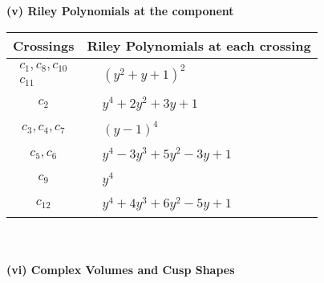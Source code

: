 \documentclass[1p]{elsarticle_modified}
\theoremstyle{definition}
\begin{document}
\newpage\renewcommand{\arraystretch}{1}
\flushleft \textbf{(v) Riley Polynomials at the component}\newline \\
\begin{tabular}{m{50pt}|m{274pt}}
Crossings & \hspace{64pt}Riley Polynomials at each crossing \\
\hline $$\begin{aligned}c_{1},c_{8},c_{10}\\c_{11}\end{aligned}$$&$\begin{aligned}
&(y^2+y+1)^2
\end{aligned}$\\
\hline $$\begin{aligned}c_{2}\end{aligned}$$&$\begin{aligned}
&y^4+2 y^2+3 y+1
\end{aligned}$\\
\hline $$\begin{aligned}c_{3},c_{4},c_{7}\end{aligned}$$&$\begin{aligned}
&(y-1)^4
\end{aligned}$\\
\hline $$\begin{aligned}c_{5},c_{6}\end{aligned}$$&$\begin{aligned}
&y^4-3 y^3+5 y^2-3 y+1
\end{aligned}$\\
\hline $$\begin{aligned}c_{9}\end{aligned}$$&$\begin{aligned}
&y^4
\end{aligned}$\\
\hline $$\begin{aligned}c_{12}\end{aligned}$$&$\begin{aligned}
&y^4+4 y^3+6 y^2-5 y+1
\end{aligned}$\\
\hline
\end{tabular}\\~\\
\newpage\flushleft \textbf{(vi) Complex Volumes and Cusp Shapes}
\end{document}
